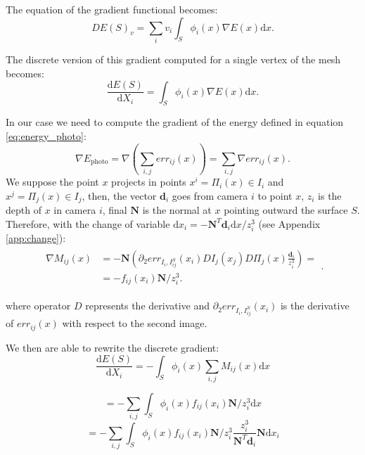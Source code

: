 The equation of the gradient functional becomes:
\begin{equation}
  DE(\mathit{S})_v = \sum_i v_i \int_{\mathit{S}} \phi_i(x) \nabla E(x) \textrm{d}x.
\end{equation}

The discrete version of this gradient computed for a single vertex of the mesh becomes:
\begin{equation}
  \frac{\textrm{d}E(\mathit{S})}{\textrm{d}X_i} =  \int_{\mathit{S}} \phi_i(x) \nabla E(x) \textrm{d}x.
\end{equation}

In our case we need to compute the gradient of the energy defined in equation \eqref{eq:energy_photo}:
\begin{equation}
  \nabla E_{\textrm{photo}} = \nabla (\sum_{i,j} err_{ij}(x)) = \sum_{i,j} \nabla err_{ij}(x).
\end{equation}
We suppose the point $x$ projects in points $x^i = \Pi_i(x) \in I_i$ and  $x^j = \Pi_j(x) \in I_j$, then, the vector $\mathbf{d}_i$ goes from camera $i$ to point $x$, $z_i$ is the depth of $x$ in camera $i$, final $\mathbf{N}$ is the normal at $x$ pointing outward the surface $\mathit{S}$. 
Therefore, with the change of variable $\textrm{d}x_i = -\mathbf{N}^T \mathbf{d}_i \textrm{d}x/z_i^3$ (see Appendix \ref{app:change}):
\begin{align}
 \begin{split}
  \nabla \mathit{M}_{ij}(x)& = -\mathbf{N} \left( \partial_2 err_{I_i, I_{ij}^{\mathit{S}}}(x_i) DI_j(x_j) D\Pi_j(x)\frac{\mathbf{d}_i}{z_i^3}\right)=\\
  &= - f_{ij}(x_i) \mathbf{N}/z_i^3.
 \end{split}.
\end{align}
    
where operator $D$ represents the derivative and $\partial_2 err_{I_i, I_{ij}^{\mathit{S}}}(x_i)$ is the derivative of $err_{ij}(x)$ with respect to the second image.


We then are able to rewrite the discrete gradient:
\begin{equation}
  \frac{\textrm{d}E(\mathit{S})}{\textrm{d}X_i} =  - \int_{\mathit{S}} \phi_i(x) \sum_{i,j} \mathit{M}_{ij}(x) \textrm{d}x 
\end{equation}

\begin{equation}
  =  - \sum_{i,j} \int_{\mathit{S}} \phi_i(x)  f_{ij}(x_i)  \mathbf{N}/z_i^3 \textrm{d}x 
\end{equation}
\begin{equation}
  =  - \sum_{i,j} \int_{\mathit{S}} \phi_i(x)  f_{ij}(x_i)  \mathbf{N}/z_i^3 \frac{z_i^3}{\mathbf{N}^T \mathbf{d}_i }\mathbf{N} \textrm{d}x_i
\end{equation}

